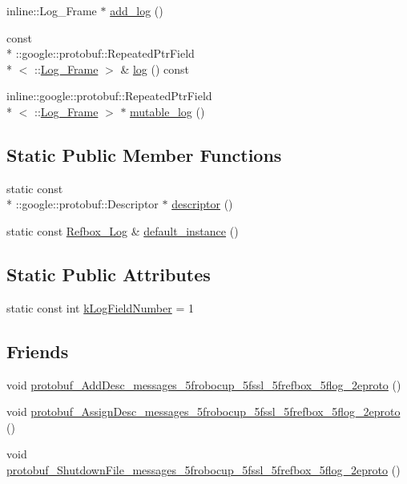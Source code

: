 \begin{DoxyCompactItemize}
\item 
inline\-::\-Log\-\_\-\-Frame $\ast$ \hyperlink{class_refbox___log_afea44b452876fb99a0b9974197744038}{add\-\_\-log} ()
\item 
const \\*
\-::google\-::protobuf\-::\-Repeated\-Ptr\-Field\\*
$<$ \-::\hyperlink{class_log___frame}{Log\-\_\-\-Frame} $>$ \& \hyperlink{class_refbox___log_a65236f4315805630893a0de86b7195b1}{log} () const 
\item 
inline\-::google\-::protobuf\-::\-Repeated\-Ptr\-Field\\*
$<$ \-::\hyperlink{class_log___frame}{Log\-\_\-\-Frame} $>$ $\ast$ \hyperlink{class_refbox___log_a9d207c24b1a1c489a87f0cae23f61431}{mutable\-\_\-log} ()
\end{DoxyCompactItemize}
\subsection*{Static Public Member Functions}
\begin{DoxyCompactItemize}
\item 
static const \\*
\-::google\-::protobuf\-::\-Descriptor $\ast$ \hyperlink{class_refbox___log_acd31df4b2cc4d63620802ba6ccb0f1f9}{descriptor} ()
\item 
static const \hyperlink{class_refbox___log}{Refbox\-\_\-\-Log} \& \hyperlink{class_refbox___log_aaeaccbca2d705668f366460d1f664265}{default\-\_\-instance} ()
\end{DoxyCompactItemize}
\subsection*{Static Public Attributes}
\begin{DoxyCompactItemize}
\item 
static const int \hyperlink{class_refbox___log_aac6fc629735ec6101af8822fef94dfa7}{k\-Log\-Field\-Number} = 1
\end{DoxyCompactItemize}
\subsection*{Friends}
\begin{DoxyCompactItemize}
\item 
void \hyperlink{class_refbox___log_a7a23ca0902a36bf9b79e1b84e0bd7dd9}{protobuf\-\_\-\-Add\-Desc\-\_\-messages\-\_\-5frobocup\-\_\-5fssl\-\_\-5frefbox\-\_\-5flog\-\_\-2eproto} ()
\item 
void \hyperlink{class_refbox___log_aa0df9fa5deee64b6f7b271534344c27c}{protobuf\-\_\-\-Assign\-Desc\-\_\-messages\-\_\-5frobocup\-\_\-5fssl\-\_\-5frefbox\-\_\-5flog\-\_\-2eproto} ()
\item 
void \hyperlink{class_refbox___log_a6dbbe3307f22c504591e58107560d1f2}{protobuf\-\_\-\-Shutdown\-File\-\_\-messages\-\_\-5frobocup\-\_\-5fssl\-\_\-5frefbox\-\_\-5flog\-\_\-2eproto} ()
\end{DoxyCompactItemize}


